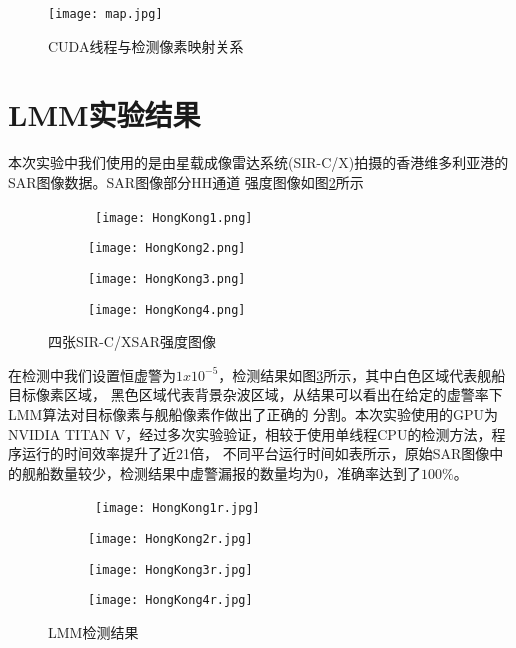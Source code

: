     \begin{figure}[H] %
      \centering
      \texttt{[image: map.jpg]}
      \caption{CUDA线程与检测像素映射关系}
      \label{fig:chap2:slide}
    \end{figure} 

\section{LMM实验结果}
    本次实验中我们使用的是由星载成像雷达系统(SIR-C/X)拍摄的香港维多利亚港的SAR图像数据。SAR图像部分HH通道
    强度图像如图\ref{fig:chap2:source}所示


  \begin{figure}[h]
    \centering%
    \begin{subfigure}{0.4\textwidth}\
      \texttt{[image: HongKong1.png]}
    \end{subfigure}%
    \begin{subfigure}{0.4\textwidth}
      \texttt{[image: HongKong2.png]}
    \end{subfigure}

    \begin{subfigure}{0.4\textwidth}
      \texttt{[image: HongKong3.png]}
    \end{subfigure}%
    \begin{subfigure}{0.4\textwidth}
      \texttt{[image: HongKong4.png]}
    \end{subfigure}   

    \caption{四张SIR-C/XSAR强度图像}
    \label{fig:chap2:source}
  \end{figure}

  在检测中我们设置恒虚警为$1x10^{-5}$，检测结果如图\ref{fig:chap2:detectresult}所示，其中白色区域代表舰船目标像素区域，
  黑色区域代表背景杂波区域，从结果可以看出在给定的虚警率下LMM算法对目标像素与舰船像素作做出了正确的
  分割。本次实验使用的GPU为NVIDIA TITAN V，经过多次实验验证，相较于使用单线程CPU的检测方法，程序运行的时间效率提升了近21倍，
  不同平台运行时间如表所示，原始SAR图像中的舰船数量较少，检测结果中虚警漏报的数量均为0，准确率达到了$100\%$。

  \begin{figure}[h]
    \centering%
    \begin{subfigure}{0.4\textwidth}\
      \texttt{[image: HongKong1r.jpg]}
    \end{subfigure}%
    \begin{subfigure}{0.4\textwidth}
      \texttt{[image: HongKong2r.jpg]}
    \end{subfigure}

    \begin{subfigure}{0.4\textwidth}
      \texttt{[image: HongKong3r.jpg]}
    \end{subfigure}%
    \begin{subfigure}{0.4\textwidth}
      \texttt{[image: HongKong4r.jpg]}
    \end{subfigure}   

    \caption{LMM检测结果}
    \label{fig:chap2:detectresult}
  \end{figure}

